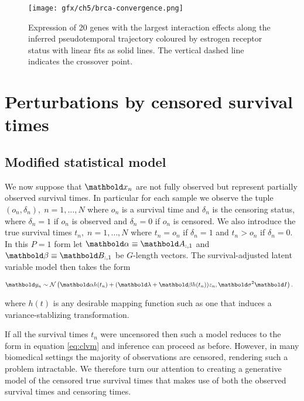 \begin{figure}
   \texttt{[image: gfx/ch5/brca-convergence.png]}
   \caption{Expression of 20 genes with the largest interaction effects along the inferred pseudotemporal trajectory coloured by estrogen receptor status with linear fits as solid lines. The vertical dashed line indicates the crossover point.}
	\label{fig:brca_convergence}
\end{figure}


\section{Perturbations by censored survival times} \label{sec:survival}

\subsection{Modified statistical model}


We now suppose that $\mbx_n$ are not fully observed but represent partially observed survival times. In particular for each sample we observe the tuple $(o_n, \delta_n), \; n = 1, \ldots, N$ where $o_n$ is a survival time and $\delta_n$ is the censoring status, where $\delta_n = 1$ if $o_n$ is observed and $\delta_n = 0$ if $o_n$ is censored. We also introduce the true survival times $t_n, \; n = 1, \ldots, N$
where $t_n = o_n$ if $\delta_n = 1$ and $t_n > o_n$ if $\delta_n = 0$. In this $P = 1$ form let $\mbalpha \equiv \mbA_{:,1}$ and $\mbbeta \equiv \mbB_{:,1}$ be $G$-length vectors. The survival-adjusted latent variable model then takes the form

\begin{equation}
  \begin{aligned}
\mby_n & \sim \Norm\left( \mbalpha h(t_n) + (\mblambda + \mbbeta h(t_n)) z_n, \mbsigma^2 \mbI\right).
  \end{aligned}
\end{equation}

where $h(t)$ is any desirable mapping function such as one that induces a variance-stablizing transformation.

If all the survival times $t_n$ were uncensored then such a model reduces to the form in equation \ref{eq:clvm} and inference can proceed as before. However, in many biomedical settings the majority of observations are censored, rendering such a problem intractable. We therefore turn our attention to creating a generative model of the censored true survival times that makes use of both the observed survival times and censoring times. %

